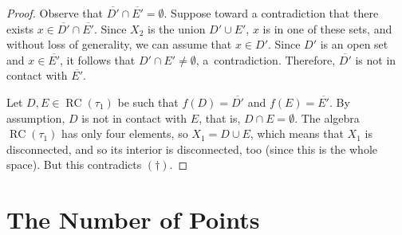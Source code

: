 \documentclass[a4paper,12pt]{amsart}
\numberwithin{equation}{section}
\theoremstyle{mytheoremstyle}
\DeclareMathOperator{\RCvtex}{RC}
\begin{document}
\begin{proof}
Observe that $\overline{D'} \cap \overline{E'} = \emptyset $. Suppose toward
a contradiction that there exists
$x \in \overline{D'} \cap \overline{E'}$. Since $X_{2}$ is the union
$D' \cup E'$, $x$ is in one of these sets, and without loss of generality,
we can assume that $x \in D'$. Since $D'$ is an open set and
$x \in \overline{E'}$, it follows that $D' \cap E' \neq \emptyset $, a~contradiction.
Therefore, $\overline{D'}$ is not in contact with $\overline{E'}$.

Let $D, E \in \RCvtex (\tau _{1})$ be such that $f(D) = \overline{D'}$ and
$f(E) = \overline{E'}$. By assumption, $D$ is not in contact with
$E$, that is, $D \cap E = \emptyset $. The algebra $\RCvtex (\tau _{1})$ has
only four elements, so $X_{1}=D\cup E$, which means that $X_{1}$ is disconnected,
and so its interior is disconnected, too (since this is the whole space).
But this contradicts $(\dagger )$.
\end{proof}

\section{The Number of Points}
\label{sec4}
\end{document}
